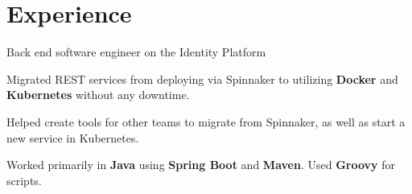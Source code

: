 \documentclass[]{deedy-resume-openfont}
\begin{document}
\begin{minipage}[t]{0.67\textwidth}


\section{Experience}
\vspace{\topsep} %
\begin{tightemize}
  \item Back end software engineer on the Identity Platform
  \item Migrated REST services from deploying via Spinnaker to utilizing \textbf{Docker} and \textbf{Kubernetes} without any downtime.
  \item Helped create tools for other teams to migrate from Spinnaker, as well as start a new service in Kubernetes.
  \item Worked primarily in \textbf{Java} using \textbf{Spring Boot} and \textbf{Maven}. Used \textbf{Groovy} for scripts.
\end{tightemize}
\sectionsep


\end{minipage}
\end{document}
